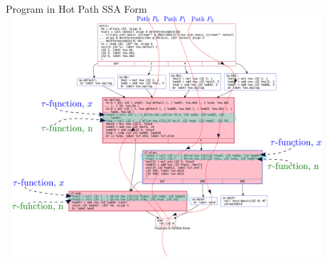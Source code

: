 \documentclass[aspectratio=169, compress]{beamer}
\begin{document}
\begin{frame}{Program in Hot Path SSA Form}
	\centering
	\includegraphics[width=12cm, height=8.95cm]{dotfiles/afterHPSSA.dot.pdf}
\end{frame}
\footnotesize
\end{document}
